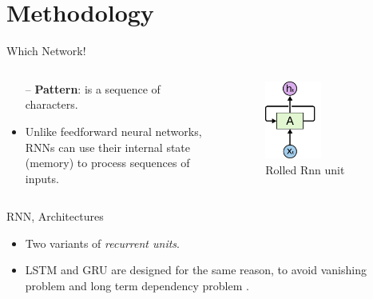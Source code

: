 \documentclass[10pt]{beamer}
\begin{document}
\section{Methodology}
\begin{frame}[fragile]{Which Network!}


\begin{columns}


\begin{column}{0.7\textwidth}
\begin{itemize}
    \item[--] \textbf{Pattern}: is a sequence of characters.
    \item  Unlike feedforward neural networks, RNNs can use their internal state (memory) to process sequences of inputs.
\end{itemize}

\end{column}



\begin{column}{0.5\textwidth}  %
    \begin{figure}
        \begin{center}
         \includegraphics[width=0.5\textwidth]{rolledRNN.png}
         \caption{Rolled Rnn unit}
         \end{center}
    \end{figure}
\end{column}
\end{columns}
\end{frame}



\begin{frame}[fragile]{RNN, Architectures}

\begin{center}
    
\end{center}
\begin{itemize}
    \item Two variants of \textit{recurrent units}.
    \item LSTM and GRU are designed for the same reason, to avoid vanishing problem and long term dependency problem .
\end{itemize}
\end{frame}
\end{document}
